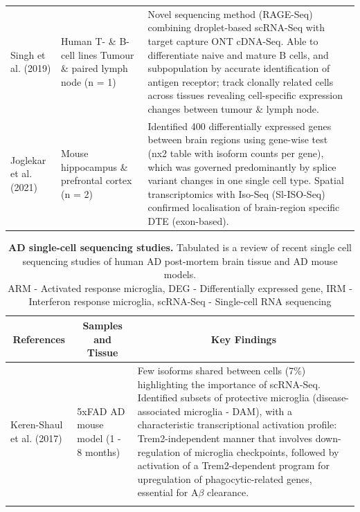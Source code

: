 \begin{landscape}
\begin{longtable}[c]{p{4cm}p{4cm}p{18cm}}
		\centering Singh et al. (2019) \cite{Singh2019} &
		\centering Human T- \& B-cell lines \newline Tumour \& paired lymph node (n = 1)  &
		\tabitem Novel sequencing method (RAGE-Seq) combining droplet-based scRNA-Seq with target capture ONT cDNA-Seq.\newline 
		\tabitem Able to differentiate naive and mature B cells, and subpopulation by accurate identification of antigen receptor; track clonally related cells across tissues revealing cell-specific expression changes between tumour \& lymph node. \\
		\hdashline[0.5pt/5pt]
		
		\centering Joglekar et al. (2021) \cite{Joglekar2021} &
		\centering Mouse hippocampus \& prefrontal cortex (n = 2) &
		\tabitem Identified 400 differentially expressed genes between brain regions using gene-wise test (nx2 table with isoform counts per gene), which was governed predominantly by splice variant changes in one single cell type. \newline 
		\tabitem Spatial transcriptomics with Iso-Seq (Sl-ISO-Seq) confirmed localisation of brain-region specific DTE (exon-based). 
		\\* \bottomrule
	\end{longtable}
	
	\clearpage
	\begin{longtable}[c]{p{4cm}p{4cm}p{18cm}}
		\caption[AD single-cell sequencing studies]%
		{\textbf{AD single-cell sequencing studies.} Tabulated is a review of recent single cell sequencing studies of human AD post-mortem brain tissue and AD mouse models. \newline ARM - Activated response microglia, DEG - Differentially expressed gene, IRM - Interferon response microglia, scRNA-Seq - Single-cell RNA sequencing}
		\label{tab: longread_AD_advancedstudies}\\
		
		\toprule
		\multicolumn{1}{c}{References} &
		\multicolumn{1}{c}{Samples and Tissue} &
		\multicolumn{1}{c}{Key Findings} \\* \midrule
		\endfirsthead
		\endhead
		\bottomrule
		\endfoot
		\endlastfoot
		\centering Keren-Shaul et al. (2017)\cite{Keren-Shaul2017} &
		\centering 5xFAD AD mouse model (1 - 8 months) &
		\tabitem Few isoforms shared between cells (7\%) highlighting the importance of scRNA-Seq. \newline
		\tabitem Identified subsets of protective microglia (disease-associated microglia - DAM), with a characteristic transcriptional activation profile: Trem2-independent manner that involves down-regulation of microglia checkpoints, followed by activation of a Trem2-dependent program for upregulation of phagocytic-related genes, essential for A$\beta$ clearance.  \\
		\hdashline[0.5pt/5pt]	
		

\end{longtable}
\end{landscape}
